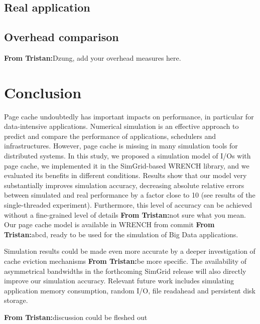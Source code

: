 \documentclass[conference]{IEEEtran}
\newcommand{\tristan}[1]{\color{orange}\textbf{From Tristan:}#1\color{black}}
\begin{document}
        \subsection{Real application}
        \subsection{Overhead comparison}
        \tristan{Dzung, add your overhead measures here.}

    \section{Conclusion}
    \label{discussion}
        Page cache undoubtedly has important impacts on performance, in
        particular for data-intensive applications. Numerical simulation is
        an effective approach to predict and compare the performance of
        applications, schedulers and infrastructures. However, page cache
        is missing in many simulation tools for distributed systems. In
        this study, we proposed a simulation model of I/Os with page cache,
        we implemented it in the SimGrid-based WRENCH library, and we
        evaluated its benefits in different conditions. Results show that
        our model very substantially improves simulation accuracy,
        decreasing absolute relative errors between simulated and real
        performance by a factor close to 10 (see results of the
        single-threaded experiment). Furthermore, this level of accuracy
        can be achieved without a fine-grained level of details
        \tristan{not sure what you mean}. Our page cache model is available
        in WRENCH from commit \tristan{abcd}, ready to be used for the
        simulation of Big Data applications.

        Simulation results could be made even more accurate by a deeper
        investigation of cache eviction mechanisms \tristan{be more
        specific}. The availability of asymmetrical bandwidths in the
        forthcoming SimGrid release will also directly improve our
        simulation accuracy. Relevant future work includes simulating
        application memory consumption, random I/O, file readahead and
        persistent disk storage.

        \tristan{discussion could be fleshed out}


\end{document}
